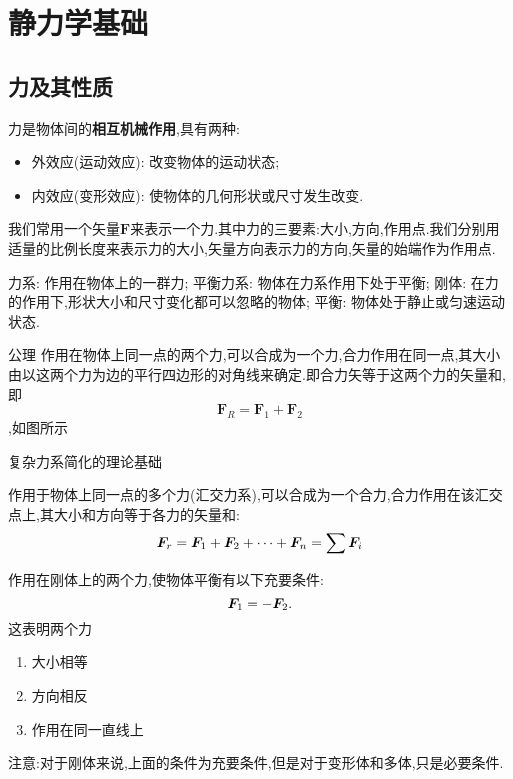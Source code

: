 \section{静力学基础}
\subsection{力及其性质}
\begin{definition}[力的定义]
    力是物体间的\textbf{相互机械作用},具有两种:
    \begin{itemize}
        \item 外效应(运动效应): 改变物体的运动状态;
        \item 内效应(变形效应): 使物体的几何形状或尺寸发生改变.
    \end{itemize}
\end{definition}

\begin{definition}[力的三要素]
    我们常用一个矢量$\bm F$来表示一个力.其中力的三要素:大小,方向,作用点.我们分别用适量的比例长度来表示力的大小,矢量方向表示力的方向,矢量的始端作为作用点.
\end{definition}

\begin{definition}[力系的概念]
    力系: 作用在物体上的一群力;
    平衡力系: 物体在力系作用下处于平衡;
    刚体: 在力的作用下,形状大小和尺寸变化都可以忽略的物体;
    平衡: 物体处于静止或匀速运动状态.
    
\end{definition}

\begin{theorem}公理
    作用在物体上同一点的两个力,可以合成为一个力,合力作用在同一点,其大小由以这两个力为边的平行四边形的对角线来确定.即合力矢等于这两个力的矢量和,即\[\bm{F}_R=\bm{F}_1+\bm{F}_2\],如图所示


    复杂力系简化的理论基础
\end{theorem}
\begin{inference}[力的多边形法则]
    作用于物体上同一点的多个力(汇交力系),可以合成为一个合力,合力作用在该汇交点上,其大小和方向等于各力的矢量和:
    \[\bm{F}_r=\bm{F}_1+\bm{F}_2+\cdots+\bm{F}_n=\sum \bm{F}_i\]
\end{inference}

\begin{theorem}[二力平衡条件]
    作用在刚体上的两个力,使物体平衡有以下充要条件:\[\bm{F}_1=-\bm{F}_2.\]这表明两个力
    \begin{enumerate}
        \item 大小相等
        \item 方向相反
        \item 作用在同一直线上
    \end{enumerate}
    注意:对于刚体来说,上面的条件为充要条件,但是对于变形体和多体,只是必要条件.
    
\end{theorem}

